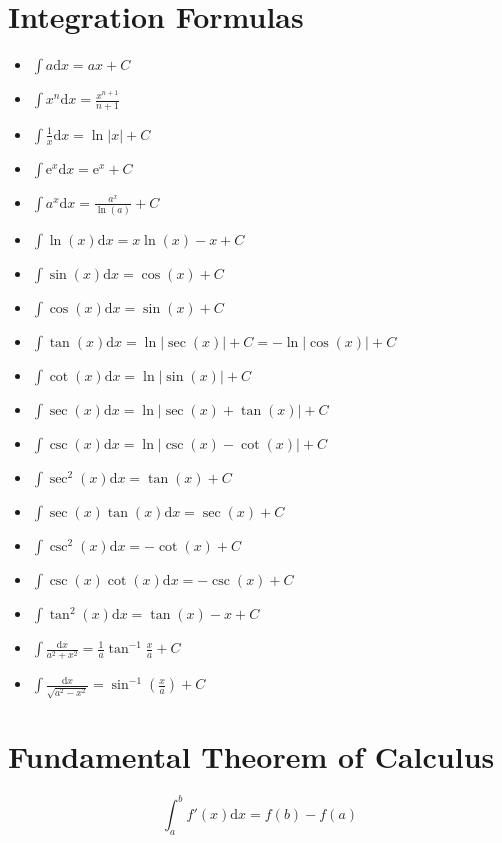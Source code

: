 \documentclass[letterpaper, 12pt]{article}
\renewcommand*{\arcsin}{\sin^{-1}}
\renewcommand*{\arctan}{\tan^{-1}}
\newcommand*{\diff}{\mathrm{d}}
\newcommand*{\e}{\mathrm{e}}
\begin{document}
\section{Integration Formulas}
\begin{itemize}
  \item \( \int{a\diff{x} = ax+C} \)
  \item \( \int{x^{n}\diff{x}} = \frac{x^{n+1}}{n + 1} \)
  \item \( \int{\frac{1}{x}\diff{x} = \ln|x|+C} \)
  \item \( \int{\e^{x}\diff{x} = \e^{x}+C} \)
  \item \( \int{a^{x}\diff{x} = \frac{a^{x}}{\ln(a)}+C} \)
  \item \( \int{\ln(x)\diff{x} = x\ln(x)-x+C} \)
  \item \( \int{\sin(x)\diff{x} = \cos(x)+C} \)
  \item \( \int{\cos(x)\diff{x} = \sin(x)+C} \)
  \item \( \int{\tan(x)\diff{x} = \ln|\sec(x)|+C = -\ln|\cos(x)|+C} \)
  \item \( \int{\cot(x)\diff{x} = \ln|\sin(x)|+C} \)
  \item \( \int{\sec(x)\diff{x} = \ln|\sec(x)+\tan(x)|+C} \)
  \item \( \int{\csc(x)\diff{x} = \ln|\csc(x)-\cot(x)|+C} \)
  \item \( \int{\sec^{2}(x)\diff{x} = \tan(x)+C} \)
  \item \( \int{\sec(x)\tan(x)\diff{x} = \sec(x)+C} \)
  \item \( \int{\csc^{2}(x)\diff{x} = -\cot(x)+C} \)
  \item \( \int{\csc(x)\cot(x)\diff{x} = -\csc(x)+C} \)
  \item \( \int{\tan^{2}(x)\diff{x} = \tan(x)-x+C} \)
  \item \( \int{\frac{\diff{x}}{a^{2}+x^{2}} =
          \frac{1}{a}\arctan{\frac{x}{a}}+C} \)
  \item \( \int{\frac{\diff{x}}{\sqrt{a^{2}-x^{2}}} = \arcsin(\frac{x}{a})+C} \)
\end{itemize}

\section{Fundamental Theorem of Calculus}
\[ \int_{a}^{b}{f'(x)\diff{x} = f(b) - f(a)} \]
\end{document}
